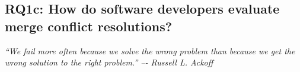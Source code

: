 \subsection{\textbf{RQ1c:} How do software developers evaluate merge conflict resolutions?}\label{RQ1c}
\vspace*{-0.5\baselineskip}
\begin{quoting}
\textit{``We fail more often because we solve the wrong problem than because we get the wrong solution to the right problem.'' –- Russell L. Ackoff}
\end{quoting}
\vspace*{+0.3\baselineskip}

